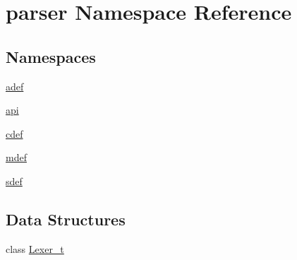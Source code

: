 \hypertarget{namespaceparser}{}\section{parser Namespace Reference}
\label{namespaceparser}
\subsection*{Namespaces}
\begin{DoxyCompactItemize}
\item 
 \hyperlink{namespaceparser_1_1adef}{adef}
\item 
 \hyperlink{namespaceparser_1_1api}{api}
\item 
 \hyperlink{namespaceparser_1_1cdef}{cdef}
\item 
 \hyperlink{namespaceparser_1_1mdef}{mdef}
\item 
 \hyperlink{namespaceparser_1_1sdef}{sdef}
\end{DoxyCompactItemize}
\subsection*{Data Structures}
\begin{DoxyCompactItemize}
\item 
class \hyperlink{classparser_1_1_lexer__t}{Lexer\+\_\+t}
\end{DoxyCompactItemize}
